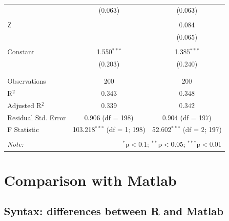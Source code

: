 \documentclass{beamer}
\begin{document}
\begin{frame}[allowframebreaks]
\begin{itemize}
\begin{table}[!htbp]
\begin{tabular}{@{\extracolsep{5pt}}lcc}
		  & (0.063) & (0.063) \\ 
		  & & \\ 
		 Z &  & 0.084 \\ 
		  &  & (0.065) \\ 
		  & & \\ 
		 Constant & 1.550$^{***}$ & 1.385$^{***}$ \\ 
		  & (0.203) & (0.240) \\ 
		  & & \\ 
		\hline \\[-1.8ex] 
		Observations & 200 & 200 \\ 
		R$^{2}$ & 0.343 & 0.348 \\ 
		Adjusted R$^{2}$ & 0.339 & 0.342 \\ 
		Residual Std. Error & 0.906 (df = 198) & 0.904 (df = 197) \\ 
		F Statistic & 103.218$^{***}$ (df = 1; 198) & 52.602$^{***}$ (df = 2; 197) \\ 
		\hline 
		\hline \\[-1.8ex] 
		\textit{Note:}  & \multicolumn{2}{r}{$^{*}$p$<$0.1; $^{**}$p$<$0.05; $^{***}$p$<$0.01} \\ 
		\end{tabular} 
		\end{table} 
	\end{itemize}
	
\end{frame}










\section[Matlab]{Comparison with Matlab}


\subsection{Syntax: differences between R and Matlab}
\end{document}
